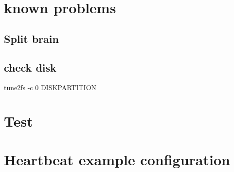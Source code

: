 \documentclass[a4paper,10pt]{report}
\begin{document}
\chapter{known problems}
\section{Split brain}
\section{check disk}
tune2fs -c 0 DISKPARTITION
\label{splitbrain} 

\chapter{Test}
















\appendix
\chapter{Heartbeat example configuration}
\label{cibexample}
\end{document}
